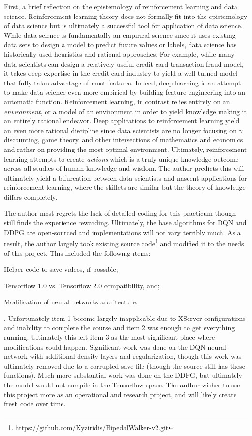 \documentclass[doc, onecolumn, 12pt]{apa6}
\begin{document}
First, a brief reflection on the epistemology of reinforcement learning and data science. Reinforcement learning theory does not formally fit into the epistemology of data science but is ultimately a successful tool for application of data science. While data science is fundamentally an empirical science since it uses existing data sets to design a model to predict future values or labels, data science has historically used heuristics and rational approaches. For example, while many data scientists can design a relatively useful credit card transaction fraud model, it takes deep expertise in the credit card industry to yield a well-turned model that fully takes advantage of most features. Indeed, deep learning is an attempt to make data science even more empirical by building feature engineering into an automatic function. Reinforcement learning, in contrast relies entirely on an \emph{environment}, or a model of an environment in order to yield knowledge making it an entirely rational endeavor. Deep applications to reinforcement learning yield an even more rational discipline since data scientists are no longer focusing on $\gamma$ discounting, game theory, and other intersections of mathematics and economics and rather on providing the most optimal environment. Ultimately, reinforcement learning attempts to create \emph{actions} which is a truly unique knowledge outcome across all studies of human knowledge and wisdom. The author predicts this will ultimately yield a bifurcation between data scientists and nascent applications for reinforcement learning, where the skillets are similar but the theory of knowledge differs completely. 

The author most regrets the lack of detailed coding for this practicum though still finds the experience rewarding. Ultimately, the base algorithms for DQN\citep{DQN_22} and DDPG\citep{DDPG} are open-sourced and implementations will not vary terribly much. As a result, the author largely took existing source code\footnote{https://github.com/Kyziridis/BipedalWalker-v2.git} and modified it to the needs of this project. This included the following items: \begin{enumerate*}
\item Helper code to save videos, if possible;
\item Tensorflow 1.0 vs. Tensorflow 2.0 compatibility, and;
\item Modification of neural networks architecture.
\end{enumerate*}. Unfortunately item 1 become largely inapplicable due to XServer configurations and inability to complete the course and item 2 was enough to get everything running. Ultimately this left item 3 as the most significant place where modifications could happen. Significant work was done on the DQN neural network with additional density layers and regularization, though this work was ultimately removed due to a corrupted save file (though the source still has these functions). Much more substantial work was done on the DDPG, but ultimately the model would not compile in the Tensorflow space. The author wishes to see this project more as an operational and research project, and will likely create fresh code over time. 
\end{document}
